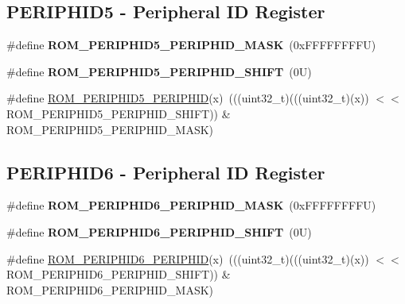 \subsection*{P\+E\+R\+I\+P\+H\+I\+D5 -\/ Peripheral ID Register}
\begin{DoxyCompactItemize}
\item 
\mbox{\label{group___m_t_b___register___masks_ga39e8a3441c79c42651efba9100e653a7}} 
\#define {\bfseries R\+O\+M\+\_\+\+P\+E\+R\+I\+P\+H\+I\+D5\+\_\+\+P\+E\+R\+I\+P\+H\+I\+D\+\_\+\+M\+A\+SK}~(0x\+F\+F\+F\+F\+F\+F\+F\+F\+U)
\item 
\mbox{\label{group___m_t_b___register___masks_ga083194b41cf1109fe5a6e235b2c1f89a}} 
\#define {\bfseries R\+O\+M\+\_\+\+P\+E\+R\+I\+P\+H\+I\+D5\+\_\+\+P\+E\+R\+I\+P\+H\+I\+D\+\_\+\+S\+H\+I\+FT}~(0\+U)
\item 
\#define \mbox{\hyperlink{group___m_t_b___register___masks_gaa801210cd537086eddf2456575251d93}{R\+O\+M\+\_\+\+P\+E\+R\+I\+P\+H\+I\+D5\+\_\+\+P\+E\+R\+I\+P\+H\+ID}}(x)~(((uint32\+\_\+t)(((uint32\+\_\+t)(x)) $<$$<$ R\+O\+M\+\_\+\+P\+E\+R\+I\+P\+H\+I\+D5\+\_\+\+P\+E\+R\+I\+P\+H\+I\+D\+\_\+\+S\+H\+I\+FT)) \& R\+O\+M\+\_\+\+P\+E\+R\+I\+P\+H\+I\+D5\+\_\+\+P\+E\+R\+I\+P\+H\+I\+D\+\_\+\+M\+A\+SK)
\end{DoxyCompactItemize}
\subsection*{P\+E\+R\+I\+P\+H\+I\+D6 -\/ Peripheral ID Register}
\begin{DoxyCompactItemize}
\item 
\mbox{\label{group___m_t_b___register___masks_gae29765428defa80237980d34b67f4fde}} 
\#define {\bfseries R\+O\+M\+\_\+\+P\+E\+R\+I\+P\+H\+I\+D6\+\_\+\+P\+E\+R\+I\+P\+H\+I\+D\+\_\+\+M\+A\+SK}~(0x\+F\+F\+F\+F\+F\+F\+F\+F\+U)
\item 
\mbox{\label{group___m_t_b___register___masks_ga0cb9b85e1ca798d1897bcef6afce8a79}} 
\#define {\bfseries R\+O\+M\+\_\+\+P\+E\+R\+I\+P\+H\+I\+D6\+\_\+\+P\+E\+R\+I\+P\+H\+I\+D\+\_\+\+S\+H\+I\+FT}~(0\+U)
\item 
\#define \mbox{\hyperlink{group___m_t_b___register___masks_gacd2a1a4b870a765537be3a9aaae25cba}{R\+O\+M\+\_\+\+P\+E\+R\+I\+P\+H\+I\+D6\+\_\+\+P\+E\+R\+I\+P\+H\+ID}}(x)~(((uint32\+\_\+t)(((uint32\+\_\+t)(x)) $<$$<$ R\+O\+M\+\_\+\+P\+E\+R\+I\+P\+H\+I\+D6\+\_\+\+P\+E\+R\+I\+P\+H\+I\+D\+\_\+\+S\+H\+I\+FT)) \& R\+O\+M\+\_\+\+P\+E\+R\+I\+P\+H\+I\+D6\+\_\+\+P\+E\+R\+I\+P\+H\+I\+D\+\_\+\+M\+A\+SK)
\end{DoxyCompactItemize}
